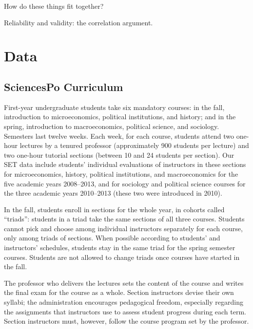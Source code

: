 \documentclass[12pt]{article}
\begin{document}
How do these things fit together?

Reliability and validity: the correlation argument.

\section{Data}
\subsection{SciencesPo Curriculum}
First-year undergraduate students take six mandatory courses: in the fall,
introduction to microeconomics, political institutions, and history; 
and in the spring, introduction to macroeconomics, political 
science, and sociology.
Semesters last twelve weeks.
Each week, for each course, students attend two one-hour lectures by a tenured professor
(approximately 900 students per lecture) and two one-hour tutorial sections 
(between 10 and 24 students per section). 
Our SET data include students' individual evaluations of instructors 
in these sections for microeconomics, history, political institutions, and 
macroeconomics for the five academic years 2008--2013,
and for sociology and political science courses for the three academic years 2010--2013 
(these two were introduced in 2010).

In the fall, students enroll in sections for the whole year, in cohorts called ``triads'':
students in a triad take the same sections of all three courses.
Students cannot pick and choose among individual instructors separately for
each course, only among triads of sections.
When possible according to students' and instructors' schedules, 
students stay in the same triad for the spring semester courses. 
Students are not allowed to change triads once courses have started in the fall. 

The professor who delivers the lectures sets the content of the course and 
writes the final exam for the course as a whole. 
Section instructors devise their own syllabi;
the administration encourages pedagogical freedom, especially regarding 
the assignments that instructors use to assess student progress during each term. 
Section instructors must, however, follow the course program set by the professor. 
\end{document}
